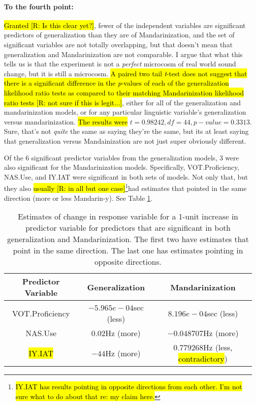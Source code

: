 \paragraph{To the fourth point:}
\hl{Granted [R: Is this clear yet?]}, fewer of the independent variables are significant predictors of generalization than they are of Mandarinization, and the set of significant variables are not totally overlapping, but that doesn't mean that generalization and Mandarinization are not comparable. I argue that what this tells us is that the experiment is not a \emph{perfect} microcosm of real world sound change, but it is still a microcosm. \hl{A paired two tail \textit{t}-test does not suggest that there is a significant difference in the \textit{p}-values of each of the generalization likelihood ratio tests as compared to their matching Mandarinization likelihood ratio tests [R: not sure if this is legit...]}, either for all of the generalization and mandarinization models, or for any particular linguistic variable's generalization versus mandarinization. \hl{The results were} $t = 0.98242, df = 44, p-value = 0.3313$. Sure, that's not \emph{quite} the same as saying they're the same, but its at least saying that generalization versus Mandainization are not just super obviously different.

Of the 6 significant predictor variables from the generalization models, 3 were also significant for the Mandarinization models. Specifically, VOT.Proficiency, NAS.Use, and IY.IAT were significant in both sets of models. Not only that, but they also \hl{usually [R: in all but one case]}\footnote{\hl{IY.IAT has results pointing in opposite directions from each other. I'm not sure what to do about that re: my claim here.}}had estimates that pointed in the same direction (more or less Mandarin-y). See Table \ref{tab:sigInBothEstimates}.

\begin{table}[]
    \centering
    \begin{tabular}{|c|c|c|}
        \hline
        \textbf{Predictor Variable} & \textbf{Generalization} & \textbf{Mandarinization}\\
        \hline
        VOT.Proficiency & $-5.965e-04$sec (less) & $8.196e-04$sec (less) \\ %
        \hline
        NAS.Use &  $0.02$Hz (more) & $-0.048707$Hz (more) \\
        \hline
        \hl{IY.IAT} &  $-44$Hz (more)& $0.779268$Hz (less, \hl{contradictory}) \\
        \hline
    \end{tabular}
    \caption{Estimates of change in response variable for a 1-unit increase in predictor variable for predictors that are significant in both generalization and Mandarinization. The first two have estimates that point in the same direction. The last one has estimates pointing in opposite directions.}
    \label{tab:sigInBothEstimates}
\end{table}

